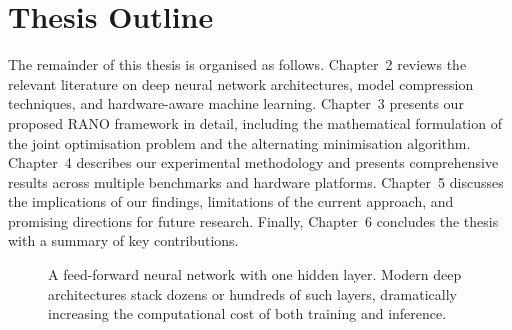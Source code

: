 \section{Thesis Outline}

The remainder of this thesis is organised as follows. Chapter~2 reviews
the relevant literature on deep neural network architectures, model
compression techniques, and hardware-aware machine learning. Chapter~3
presents our proposed RANO framework in detail, including the
mathematical formulation of the joint optimisation problem and the
alternating minimisation algorithm. Chapter~4 describes our experimental
methodology and presents comprehensive results across multiple benchmarks
and hardware platforms. Chapter~5 discusses the implications of our
findings, limitations of the current approach, and promising directions
for future research. Finally, Chapter~6 concludes the thesis with a
summary of key contributions.

\begin{figure}[htbp]
\centering
{}
\caption{A feed-forward neural network with one hidden layer. Modern
deep architectures stack dozens or hundreds of such layers, dramatically
increasing the computational cost of both training and inference.}
\label{fig:nn}
\end{figure}

